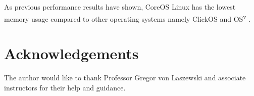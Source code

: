 \documentclass[9pt,twocolumn,twoside]{../../styles/osajnl}
\begin{document}
As previous performance results have shown, CoreOS Linux has the lowest
memory usage compared to other operating systems namely ClickOS and
OS\textsuperscript{v} \cite{2016NFVSolutions}.


\section*{Acknowledgements}
The author would like to thank Professor Gregor von Laszewski and
associate instructors for their help and guidance.





 

\newpage

\appendix
\end{document}
